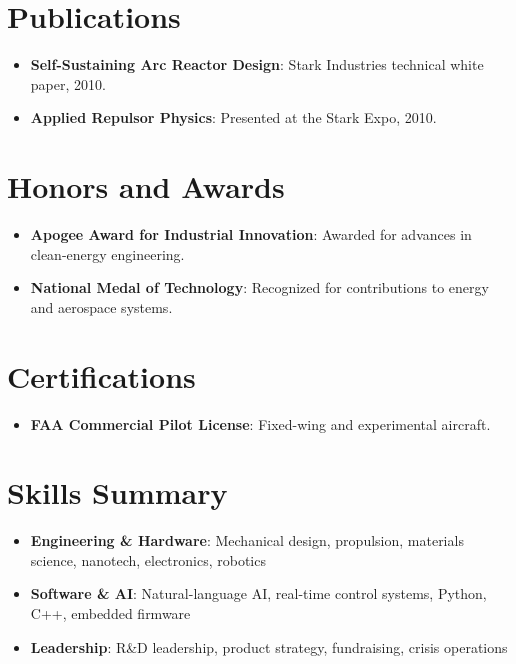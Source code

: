 \documentclass[a4paper,11pt]{article}
\newcommand{\resumeItem}[2]{
  \item\small{
    \textbf{#1}{: #2 \vspace{-2pt}}
  }
}
\newcommand{\resumeSubItem}[2]{\resumeItem{#1}{#2}\vspace{-3pt}}
\newcommand{\resumeSubHeadingListStart}{\begin{itemize}[leftmargin=*]}
\newcommand{\resumeSubHeadingListEnd}{\end{itemize}}
\begin{document}
\section{Publications}
\resumeSubHeadingListStart
\resumeSubItem{Self-Sustaining Arc Reactor Design}{Stark Industries technical white paper, 2010.}
\resumeSubItem{Applied Repulsor Physics}{Presented at the Stark Expo, 2010.}
\resumeSubHeadingListEnd
\vspace{-10pt}

\section{Honors and Awards}
\resumeSubHeadingListStart
\resumeSubItem{Apogee Award for Industrial Innovation}{Awarded for advances in clean-energy engineering.}
\resumeSubItem{National Medal of Technology}{Recognized for contributions to energy and aerospace systems.}
\resumeSubHeadingListEnd
\vspace{-10pt}

\section{Certifications}
\resumeSubHeadingListStart
\resumeSubItem{FAA Commercial Pilot License}{Fixed-wing and experimental aircraft.}
\resumeSubHeadingListEnd
\vspace{-10pt}

\section{Skills Summary}
\resumeSubHeadingListStart
\resumeSubItem{Engineering \& Hardware}{Mechanical design, propulsion, materials science, nanotech, electronics, robotics}
\resumeSubItem{Software \& AI}{Natural-language AI, real-time control systems, Python, C++, embedded firmware}
\resumeSubItem{Leadership}{R\&D leadership, product strategy, fundraising, crisis operations}
\resumeSubHeadingListEnd
\end{document}

